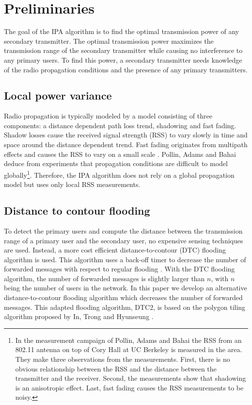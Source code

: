 \section{Preliminaries}\label{sec:pre}

The goal of the IPA algorithm is to find the optimal transmission power of any secondary transmitter. The optimal transmission power maximizes the transmission range of the secondary transmitter while causing no interference to any primary users. To find this power, a secondary transmitter needs knowledge of the radio propagation conditions and the presence of any primary transmitters. 
\subsection{Local power variance}

Radio propagation is typically modeled by a model consisting of three components: a distance dependent path loss trend, shadowing and fast fading. Shadow losses cause the received signal strength (RSS) to vary slowly in time and space around the distance dependent trend. Fast fading originates from multipath effects and causes the RSS to vary on a small scale \cite{bookPathlossModel}. Pollin, Adams and Bahai deduce from experiments that propagation conditions are difficult to model globally\footnote{In the measurement campaign of Pollin, Adams and Bahai \cite{sofie} the RSS from an 802.11 antenna on top of Cory Hall at UC Berkeley is measured in the area. They make three observations from the measurements. First, there is no obvious relationship between the RSS and the distance between the transmitter and the receiver. Second, the measurements show that shadowing is an anisotropic effect. Last, fast fading causes the RSS measurements to be noisy.}\cite{sofie}. Therefore, the IPA algorithm does not rely on a global propagation model but uses only local RSS measurements.

\subsection{Distance to contour flooding}
To detect the primary users and compute the distance between the transmission range of a primary user and the secondary user, no expensive sensing techniques are used. Instead, a more cost efficient distance-to-contour (DTC) flooding algorithm is used. This algorithm uses a back-off timer to decrease the number of forwarded messages with respect to regular flooding \cite{dtc}. With the DTC flooding algorithm, the number of forwarded messages is slightly larger than $n$, with $n$ being the number of users in the network. In this paper we develop an alternative distance-to-contour flooding algorithm which decreases the number of forwarded messages. This adapted flooding algorithm, DTC2, is based on the polygon tiling algorithm proposed by In, Trong and Hyunseung \cite{dtc2}.

